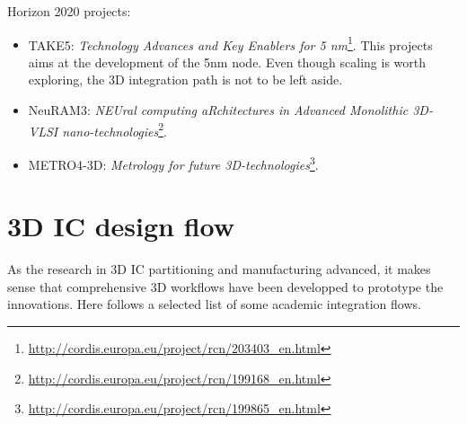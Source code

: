 \documentclass[11pt,a4paper]{report} %
\theoremstyle{customdef}
\begin{document}
Horizon 2020 projects:
\begin{itemize}
	\item TAKE5: \textit{Technology Advances and Key Enablers for 5 nm}\footnote{\url{http://cordis.europa.eu/project/rcn/203403_en.html}}. This projects aims at the development of the 5nm node. Even though scaling is worth exploring, the 3D integration path is not to be left aside.
	\item NeuRAM3: \textit{NEUral computing aRchitectures in Advanced Monolithic 3D-VLSI nano-technologies}\footnote{\url{http://cordis.europa.eu/project/rcn/199168_en.html}}.
	\item METRO4-3D: \textit{Metrology for future 3D-technologies}\footnote{\url{http://cordis.europa.eu/project/rcn/199865_en.html}}.
\end{itemize}




\section{3D IC design flow}\label{sec:flows}
As the research in 3D IC partitioning and manufacturing advanced, it makes sense that comprehensive 3D workflows have been developped to prototype the innovations.
Here follows a selected list of some academic integration flows.
\end{document}
